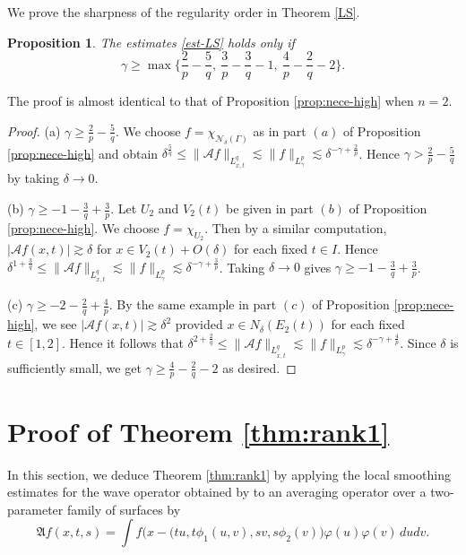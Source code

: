 \documentclass[10pt] %
{amsart}
\theoremstyle{plain}
\newtheorem{prop}[thm]{Proposition}
\numberwithin{equation}{section}
\begin{document}
We prove the sharpness of the regularity order in Theorem \ref{LS}.

\begin{prop}
The estimates \eqref{est-LS} holds only if
\[
\gamma \ge \max \Big\{ \frac 2p-\frac 5q,~ \frac3p-\frac3q-1,  ~  
\frac 4p  -\frac2q -2 \Big\}.
\]
\end{prop}

The proof is almost identical to that of Proposition \ref{prop:nece-high} when $n=2$.

\begin{proof}
(a) $\gamma \ge \frac2p-\frac5q$. We choose $f=\chi_{\mathcal N_\delta(\Gamma)}$ as in part $(a)$ of Proposition \ref{prop:nece-high} and obtain
$\delta^{\frac5q}\le\|\mathcal Af\|_{L_{x,t}^q}\lesssim\|f\|_{L_\gamma^p}\lesssim \delta^{-\gamma+\frac2p}$. Hence $\gamma>\frac2p-\frac5q$ by taking $\delta \rightarrow 0$.

\smallskip
 
\noindent(b) $\gamma \ge -1-\frac3q+\frac3p$. Let $U_2$ and $V_2(t)$ be given in part $(b)$ of Proposition \ref{prop:nece-high}. We choose $f=\chi_{U_2}$. Then by a similar computation, $|\mathcal Af(x,t)|\gtrsim \delta$ for $x\in V_2(t)+O(\delta)$ for each fixed $t\in I$. Hence $\delta^{1+\frac3q}\le\|\mathcal Af\|_{L_{x,t}^q}\lesssim\|f\|_{L_\gamma^p}\lesssim \delta^{-\gamma+\frac3p}$. Taking $\delta\rightarrow0$ gives $\gamma \ge -1-\frac3q+\frac3p$.

\smallskip

\noindent(c) $\gamma \ge -2-\frac2q+\frac4p$. By the same example in part $(c)$ of Proposition \ref{prop:nece-high}, we see $|\mathcal Af(x,t)|\gtrsim\delta^2$ provided $x\in N_\delta(E_2(t))$  
for each fixed $t\in [1,2]$. Hence it follows that
$\delta^{2+\frac2q}\le\|\mathcal Af\|_{L_{x,t}^q}\lesssim\|f\|_{L_\gamma^p}\lesssim \delta^{-\gamma+\frac4p}$. Since $\delta$ is sufficiently small, we get $\gamma \ge \frac 4p-\frac 2q-2$ as  desired.
\end{proof}





\appendix
\section{Proof of Theorem \ref{thm:rank1}}\label{rank1case}
In this section, we deduce Theorem \ref{thm:rank1} by applying the local smoothing estimates for the wave operator obtained by \cite{Lee} to 
an averaging operator over a two-parameter family of surfaces by
\[ 
\mathfrak Af(x,t,s)=\int f\big(x-(tu,t\phi_1(u,v),sv,s\phi_2(v)\big)\varphi(u)\varphi(v)\,dudv.
\]
\end{document}
